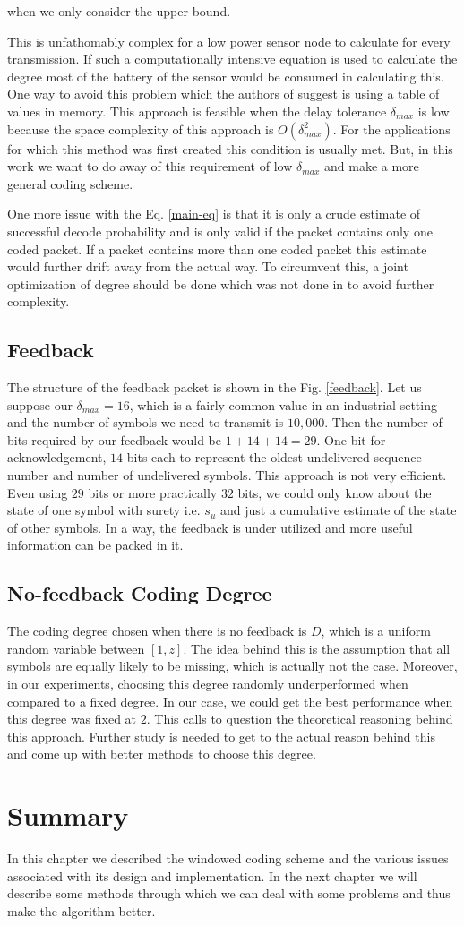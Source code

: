 when we only consider the upper bound.

This is unfathomably complex for a low power sensor node to calculate for every transmission. If such a computationally intensive equation is used to calculate the degree most of the battery of the sensor would be consumed in calculating this. One way to avoid this problem which the authors of \cite{borkotokyicc} suggest is using a table of values in memory. This approach is feasible when the delay tolerance $\delta_{max}$ is low because the space complexity of this approach is $O\left(\delta_{max}^2\right)$. For the applications for which this method was first created this condition is usually met. But, in this work we want to do away of this requirement of low $\delta_{max}$ and make a more general coding scheme.

One more issue with the Eq. \ref{main-eq} is that it is only a crude estimate of successful decode probability and is only valid if the packet contains only one coded packet. If a packet contains more than one coded packet this estimate would further drift away from the actual way. To circumvent this, a joint optimization of degree should be done which was not done in \cite{borkotokyicc} to avoid further complexity.


\subsection{Feedback}
\label{feedback-issue}
The structure of the feedback packet is shown in the Fig. \ref{feedback}. Let us suppose our $\delta_{max} = 16$, which is a fairly common value in an industrial setting and the number of symbols we need to transmit is $10,000$. Then the number of bits required by our feedback would be $1 + 14 + 14 = 29$. One bit for acknowledgement, $14$ bits each to represent the oldest undelivered sequence number and number of undelivered symbols. This approach is not very efficient. Even using $29$ bits or more practically $32$ bits, we could only know about the state of one symbol with surety i.e. $s_u$ and just a cumulative estimate of the state of other symbols. In a way, the feedback is under utilized and more useful information can be packed in it.

\subsection{No-feedback Coding Degree}
\label{no-fd}
The coding degree chosen when there is no feedback is $D$, which is a uniform random variable between $[1, z]$. The idea behind this is the assumption that all symbols are equally likely to be missing, which is actually not the case. Moreover, in our experiments, choosing this degree randomly underperformed when compared to a fixed degree. In our case, we could get the best performance when this degree was fixed at $2$. This calls to question the theoretical reasoning behind this approach. Further study is needed to get to the actual reason behind this and come up with better methods to choose this degree.

\section{Summary}

In this chapter we described the windowed coding scheme and the various issues associated with its design and implementation. In the next chapter we will describe some methods through which we can deal with some problems and thus make the algorithm better.

